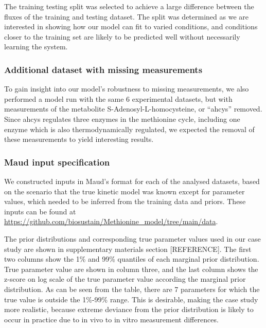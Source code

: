 \documentclass[journal=asbcd6,manuscript=article,layout=traditional]{achemso}
\begin{document}
The training testing split was selected to achieve a large difference
between the fluxes of the training and testing dataset. The split was
determined as we are interested in showing how our model can fit to
varied conditions, and conditions closer to the training set are likely
to be predicted well without necessarily learning the system.

\hypertarget{additional-dataset-with-missing-measurements}{%
\subsubsection{Additional dataset with missing
measurements}\label{additional-dataset-with-missing-measurements}}

To gain insight into our model's robustness to missing measurements, we
also performed a model run with the same 6 experimental datasets, but
with measurements of the metabolite S-Adenosyl-L-homocysteine, or
``ahcys'' removed. Since ahcys regulates three enzymes in the methionine
cycle, including one enzyme which is also thermodynamically regulated,
we expected the removal of these measurements to yield interesting
results.

\hypertarget{maud-input-specification}{%
\subsubsection{Maud input
specification}\label{maud-input-specification}}

We constructed inputs in Maud's format for each of the analysed
datasets, based on the scenario that the true kinetic model was known
except for parameter values, which needed to be inferred from the
training data and priors. These inputs can be found at
\url{https://github.com/biosustain/Methionine_model/tree/main/data}.

The prior distributions and corresponding true parameter values used in
our case study are shown in supplementary materials section
{[}REFERENCE{]}. The first two columns show the 1\% and 99\% quantiles
of each marginal prior distribution. True parameter value are shown in
column three, and the last column shows the z-score on log scale of the
true parameter value according the marginal prior distribution. As can
be seen from the table, there are 7 parameters for which the true value
is outside the 1\%-99\% range. This is desirable, making the case study
more realistic, because extreme deviance from the prior distribution is
likely to occur in practice due to in vivo to in vitro measurement
differences.
\end{document}
